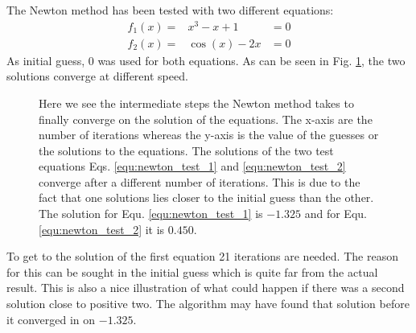 \documentclass{aa}
\begin{document}
The Newton method has been tested with two different equations:
\begin{eqnarray}
    f_1(x) =& x^3 - x + 1 &= 0 \label{equ:newton_test_1}\\
    f_2(x) =& \cos(x) - 2x &= 0 \label{equ:newton_test_2}
\end{eqnarray}
As initial guess, 0 was used for both equations. As can be seen in Fig.
\ref{fig:Newton_results}, the two solutions converge at different speed.
\begin{figure}[tbp]
    \caption{Here we see the intermediate steps the Newton method takes to
    finally converge on the solution of the equations.
    The x-axis are the number of iterations whereas the y-axis is the 
    value of the guesses or the solutions to the equations. The solutions of the
    two test equations Eqs. \ref{equ:newton_test_1} and \ref{equ:newton_test_2} 
    converge after a different number of iterations. This is due to the fact 
    that one solutions lies closer to the initial guess than the other. The 
    solution for Equ. \ref{equ:newton_test_1} is \(-1.325\) and for Equ. 
    \ref{equ:newton_test_2} it is \(0.450\).}
    \label{fig:Newton_results}
\end{figure}
To get to the solution of the first equation 21 iterations are needed. The
reason for this can be sought in the initial guess which is quite far from the
actual result. This is also a nice illustration of what could happen if there
was a second solution close to positive two. The algorithm may have found that
solution before it converged in on \(-1.325\).
\end{document}
